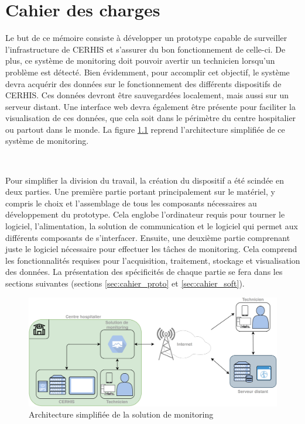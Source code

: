 \chapter{Cahier des charges}
\label{chap:3}

\noindent
Le but de ce mémoire consiste à développer un prototype capable de surveiller l'infrastructure de CERHIS et s'assurer du bon fonctionnement de celle-ci. De plus, ce système de monitoring doit pouvoir avertir un technicien lorsqu'un problème est détecté. Bien évidemment, pour accomplir cet objectif, le système devra acquérir des données sur le fonctionnement des différents dispositifs de CERHIS. Ces données devront être sauvegardées localement, mais aussi sur un serveur distant. Une interface web devra également être présente pour faciliter la visualisation de ces données, que cela soit dans le périmètre du centre hospitalier ou partout dans le monde. La figure \ref{fig:mon_archi_simple} reprend l'architecture simplifiée de ce système de monitoring.

~

\noindent
Pour simplifier la division du travail, la création du dispositif a été scindée en deux parties.
Une première partie portant principalement sur le matériel, y compris le choix et l'assemblage de tous les composants nécessaires au développement du prototype. Cela englobe l'ordinateur requis pour tourner le logiciel, l'alimentation, la solution de communication et le logiciel qui permet aux différents composants de s'interfacer. Ensuite, une deuxième partie comprenant juste le logiciel nécessaire pour effectuer les tâches de monitoring. Cela comprend les fonctionnalités requises pour l'acquisition, traitement, stockage et visualisation des données. La présentation des spécificités de chaque partie se fera dans les sections suivantes (sections \ref{sec:cahier_proto} et \ref{sec:cahier_soft}).



\begin{figure}[ht!]
  \centering
  \includegraphics[width=\textwidth]{img/cahier_des_charges/baseline_archi.png}
  \caption{Architecture simplifiée de la solution de monitoring}
  \label{fig:mon_archi_simple}
\end{figure}

